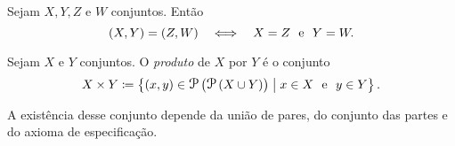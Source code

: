 \begin{prop}
Sejam $X,Y,Z$ e $W$ conjuntos. Então
	\begin{equation*}
	(X,Y) = (Z,W) \quad \Longleftrightarrow \quad X=Z \text{\ \ e\ \ } Y=W.
	\end{equation*}
\end{prop}

\begin{defi}
Sejam $X$ e $Y$ conjuntos. O \emph{produto} de $X$ por $Y$ é o conjunto
	\begin{equation*}
	X \times Y \coloneqq \set{(x,y) \in \p\left(\p\left(X \cup Y\right)\right)}{x \in X \e y \in Y}.
	\end{equation*}
\end{defi}

A existência desse conjunto depende da união de pares, do conjunto das partes e do axioma de especificação.

%

%

